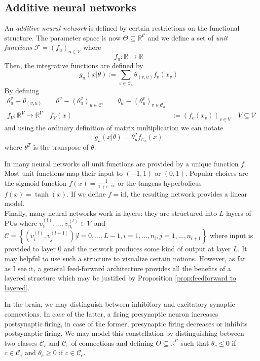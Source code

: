\documentclass[a4paper,11pt]{article}
\begin{document}
\subsection{Additive neural networks}
\begin{Def}
An \emph{additive neural network} is defined by certain restrictions on the functional structure. The parameter space is now $\Theta\subseteq\mathbb{R}^{\mathcal{C}}$ and we define a set of \emph{unit functions} $\mathcal{F}=(f_u)_{u\in\mathcal{V}}$ where
\begin{equation}
f_u:\mathbb{R}\to\mathbb{R}
\end{equation}
Then, the integrative functions are defined by
\begin{equation}
g_u(x|\theta):=\sum_{v\in\mathcal{C}_u}\theta_{(v,u)}f_v(x_v)
\end{equation}
By defining
\begin{align}
\theta^v_u\equiv\theta_{(v,u)}\qquad\theta^v\equiv\left(\theta^v_u\right)_{u\in\mathcal{C}^v}\qquad\theta_u\equiv\left(\theta^v_u\right)_{v\in\mathcal{C}_u}\\
f_V:\mathbb{R}^V\to\mathbb{R}^V\quad f_V(x)&:=\left(f_v(x_v)\right)_{v\in V}\quad V\subseteq\mathcal{V}
\end{align}
and using the ordinary definition of matrix multiplication we can notate
\begin{equation}
g_u(x|\theta)=\theta_u^Tf_{\mathcal{C}_u}(x)
\end{equation}
where $\theta^T$ is the transpose of $\theta$.
\end{Def}
\begin{Abs}
In many neural networks all unit functions are provided by a unique function $f$. Most unit functions map their input to $(-1,1)$ or $(0,1)$. Popular choices are the sigmoid function $f(x)=\frac{1}{1+e^{-cx}}$ or the tangens hyperbolicus $f(x)=\tanh(x)$. If we define $f=\text{id}$, the resulting network provides a linear model.\\
Finally, many neural networks work in layers: they are structured into $L$ layers of PUs where $v_1^{(l)},\dotsc,v_{n_i}^{(l)}\in\mathcal{V}$ and $\mathcal{C}=\left\{(v_i^{(l)},v_j^{(l+1)})|l=0,\dotsc,L-1,i=1,\dotsc,n_l,j=1,\dotsc,n_{l+1}\right\}$ where input is provided to layer $0$ and the network produces some kind of output at layer $L$. It may helpful to use such a structure to visualize certain notions. However, as far as I see it, a general feed-forward architecture provides all the benefits of a layered structure which may be justified by Proposition \ref{prop:feedforward to layered}.
\end{Abs}
\begin{Bei}\label{ex:inhib}
In the brain, we may distinguish between inhibitory and excitatory synaptic connections. In case of the latter, a firing presynaptic neuron increases postsynaptic firing, in case of the former, presynaptic firing decreases or inhibits postsynaptic firing. We may model this constellation by distinguishing between two classes $\mathcal{C}_i$ and $\mathcal{C}_e$ of connections and defining $\Theta\subseteq\mathbb{R}^{\mathcal{C}}$ such that $\theta_c\le0$ if $c\in\mathcal{C}_i$ and $\theta_c\ge0$ if $c\in\mathcal{C}_e$.
\end{Bei}
\end{document}
